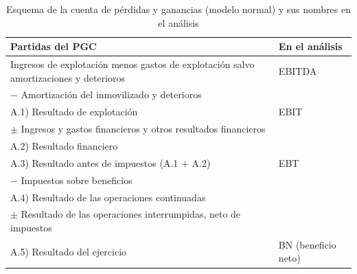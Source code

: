 \documentclass[11pt]{article}
\begin{document}
\begin{table}[H]
\centering
\caption{Esquema de la cuenta de pérdidas y ganancias (modelo normal) y sus nombres en el análisis}\label{tab:pyg}
\small
\renewcommand{\arraystretch}{1.2}
\begin{tabular}{>{\raggedright\arraybackslash}m{9.4cm}>{\centering\arraybackslash}m{4.4cm}}
\toprule
\rowcolor{tceeazulpalido}\textbf{Partidas del PGC} & \textbf{En el análisis} \\
\midrule
Ingresos de explotación menos gastos de explotación salvo amortizaciones y deterioros & EBITDA \\
$-$ Amortización del inmovilizado y deterioros & \\
\rowcolor{tceesalvia}A.1) Resultado de explotación & EBIT \\
$\pm$ Ingresos y gastos financieros y otros resultados financieros & \\
\rowcolor{tceesalvia}A.2) Resultado financiero & \\
\rowcolor{tceesalvia}A.3) Resultado antes de impuestos (A.1 + A.2) & EBT \\
$-$ Impuestos sobre beneficios & \\
\rowcolor{tceesalvia}A.4) Resultado de las operaciones continuadas & \\
$\pm$ Resultado de las operaciones interrumpidas, neto de impuestos & \\
\rowcolor{tceesalvia}A.5) Resultado del ejercicio & BN (beneficio neto) \\
\bottomrule
\end{tabular}
\end{table}
\end{document}

